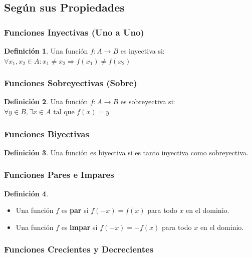 \documentclass[12pt, a4paper, oneside]{book}
\theoremstyle{definition}
\newtheorem{definicion}{Definición}[chapter]
\begin{document}
\subsection{Según sus Propiedades}

\subsubsection{Funciones Inyectivas (Uno a Uno)}

\begin{definicion}
Una función $f: A \rightarrow B$ es inyectiva si:
$\forall x_1, x_2 \in A: x_1 \neq x_2 \Rightarrow f(x_1) \neq f(x_2)$
\end{definicion}

\subsubsection{Funciones Sobreyectivas (Sobre)}

\begin{definicion}
Una función $f: A \rightarrow B$ es sobreyectiva si:
$\forall y \in B, \exists x \in A \text{ tal que } f(x) = y$
\end{definicion}

\subsubsection{Funciones Biyectivas}

\begin{definicion}
Una función es biyectiva si es tanto inyectiva como sobreyectiva.
\end{definicion}

\subsubsection{Funciones Pares e Impares}

\begin{definicion}
\begin{itemize}
    \item Una función $f$ es \textbf{par} si $f(-x) = f(x)$ para todo $x$ en el dominio.
    \item Una función $f$ es \textbf{impar} si $f(-x) = -f(x)$ para todo $x$ en el dominio.
\end{itemize}
\end{definicion}

\subsubsection{Funciones Crecientes y Decrecientes}
\end{document}
